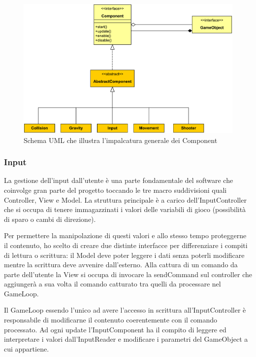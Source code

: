\documentclass[a4paper,12pt]{report}
\begin{document}
\begin{figure}[H]
\includegraphics[width=\linewidth]{img/component}
\caption{Schema UML che illustra l'impalcatura generale dei Component}
\label{img:decorator}
\end{figure}

\subsubsection*{Input}

La gestione dell'input dall'utente è una parte fondamentale del software che coinvolge gran parte del progetto toccando le tre macro suddivisioni quali Controller, View e Model.
La struttura principale è a carico dell'InputController che si occupa di tenere immagazzinati i valori delle variabili di gioco (possibilità di sparo o cambi di direzione).

Per permettere la manipolazione di questi valori e allo stesso tempo proteggerne il contenuto, ho scelto di creare due distinte interfacce per differenziare i compiti di lettura o scrittura: il Model deve poter leggere i dati senza poterli modificare mentre la scrittura deve avvenire dall'esterno.
Alla cattura di un comando da parte dell'utente la View si occupa di invocare la sendCommand sul controller che aggiungerà a sua volta il comando catturato tra quelli da processare nel GameLoop.

Il GameLoop essendo l'unico ad avere l'accesso in scrittura all'InputController è responsabile di modificarne il contenuto coerentemente con il comando processato.
Ad ogni update l'InputComponent ha il compito di leggere ed interpretare i valori dall'InputReader e modificare i parametri del GameObject a cui appartiene.
\end{document}
